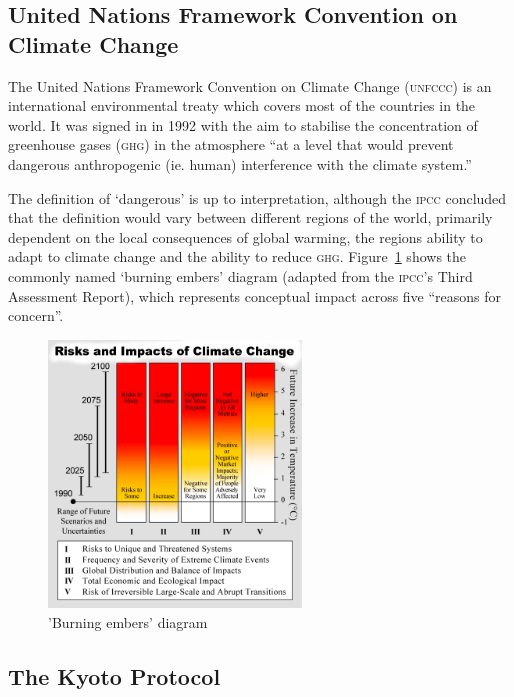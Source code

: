 \documentclass[]{article} %
\begin{document}
\subsection{United Nations Framework Convention on Climate Change}

The United Nations Framework Convention on Climate Change (\textsc{unfccc}) is an international environmental treaty which covers most of the countries in the world. It was signed in in 1992 with the aim to stabilise the concentration of greenhouse gases (\textsc{ghg}) in the atmosphere ``at a level that would prevent dangerous anthropogenic (ie. human) interference with the climate system.''~\cite{IPCC-synthesis-01-question1}

The definition of ‘dangerous’ is up to interpretation, although the \textsc{ipcc} concluded that the definition would vary between different regions of the world, primarily dependent on the local consequences of global warming, the regions ability to adapt to climate change and the ability to reduce \textsc{ghg}. Figure~\ref{fig:burning_embers} shows the commonly named ‘burning embers’ diagram (adapted from the \textsc{ipcc}’s Third Assessment Report), which represents conceptual impact across five ``reasons for concern''.

\begin{figure}[h!]
	\centering
	\includegraphics[width=0.6\textwidth]{img/Risks_and_Impacts_of_Global_Warming.png}
	\caption{'Burning embers' diagram~\cite{IPCC-workinggroup-01}}
	\label{fig:burning_embers}
\end{figure}

\subsection{The Kyoto Protocol}
\end{document}
